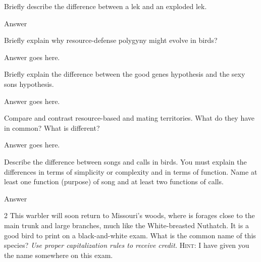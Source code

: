 \documentclass[12pt, addpoints]{exam}
\newcommand*\AnswerBox[2]{%
    \parbox[t][#1]{0.92\textwidth}{%
    \begin{solution}#2\end{solution}}
    \vspace{\stretch{1}}
}
\begin{document}
\begin{questions}
\question[5]
Briefly describe the difference between a lek and an exploded lek.

\AnswerBox{0.1\textheight}{Answer}


\question[5]
Briefly explain why resource-defense polygyny might evolve in birds?

\AnswerBox{0.1\textheight}{%
	Answer goes here.}%

\newpage




	
\question[10]
Briefly explain the difference between the good genes hypothesis and the sexy sons hypothesis.

\AnswerBox{0.2\textheight}{Answer goes here.}




%



\question[10]
Compare and contrast resource-based and mating territories. What do they have in common? What is different? 

\AnswerBox{0.2\textheight}{Answer goes here.}


\newpage

\question[10]
Describe the difference between songs and calls in birds. You must explain the differences in terms of simplicity or complexity and in terms of function. Name at least one function (purpose) of song and at least two functions of calls.

%
\AnswerBox{0.2\textheight}{Answer}

\bonusquestion[2]
\begin{multicols}{2}
	This warbler will soon return to Missouri's woods, where is forages close to the main trunk and large branches, much like the White-breasted Nuthatch.  It is a good bird to print on a black-and-white exam.  What is the common name of this species? \textit{Use proper capitalization rules to receive credit.} \textsc{Hint:} I have given you the name somewhere on this exam. 
	

\end{multicols}
\end{questions}
\end{document}
